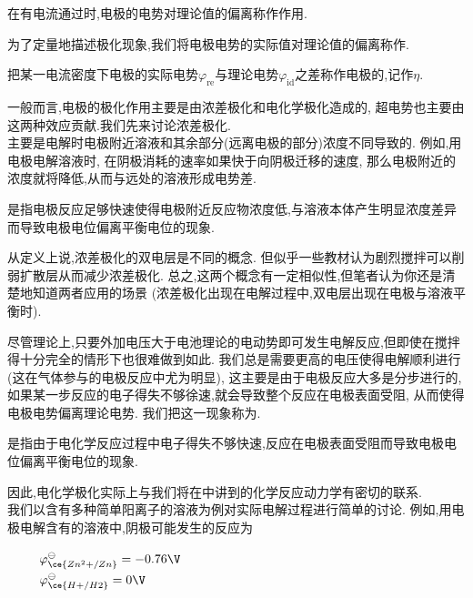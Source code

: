 \documentclass{ctexart}
\begin{document}
\begin{definition}[6E.1.3 极化]
    在有电流通过时,电极的电势对理论值的偏离称作作用.
\end{definition}
为了定量地描述极化现象,我们将电极电势的实际值对理论值的偏离称作.
\begin{definition}[6E.1.4 超电势]
    把某一电流密度下电极的实际电势$\varphi_{\text{re}}$与理论电势$\varphi_{\text{id}}$之差称作电极的,记作$\eta$.
\end{definition}
一般而言,电极的极化作用主要是由浓差极化和电化学极化造成的,%
超电势也主要由这两种效应贡献.我们先来讨论浓差极化.\\
\indent {}主要是电解时电极附近溶液和其余部分(远离电极的部分)浓度不同导致的.%
例如,用电极电解溶液时,%
在阴极消耗的速率如果快于向阴极迁移的速度,%
那么电极附近的浓度就将降低,从而与远处的溶液形成电势差.
\begin{definition}[6E.1.5 浓差极化]
    是指电极反应足够快速使得电极附近反应物浓度低,与溶液本体产生明显浓度差异而导致电极电位偏离平衡电位的现象.
\end{definition}
\begin{hint}
    从定义上说,浓差极化的双电层是不同的概念.%
    但似乎一些教材认为剧烈搅拌可以削弱扩散层从而减少浓差极化.%
    总之,这两个概念有一定相似性,但笔者认为你还是清楚地知道两者应用的场景%
    (浓差极化出现在电解过程中,双电层出现在电极与溶液平衡时).
\end{hint}
尽管理论上,只要外加电压大于电池理论的电动势即可发生电解反应,但即使在搅拌得十分完全的情形下也很难做到如此.%
我们总是需要更高的电压使得电解顺利进行(这在气体参与的电极反应中尤为明显),%
这主要是由于电极反应大多是分步进行的,如果某一步反应的电子得失不够徐速,就会导致整个反应在电极表面受阻,%
从而使得电极电势偏离理论电势.%
我们把这一现象称为.
\begin{definition}[6E.1.6 电化学极化]
    是指由于电化学反应过程中电子得失不够快速,反应在电极表面受阻而导致电极电位偏离平衡电位的现象.
\end{definition}
因此,电化学极化实际上与我们将在中讲到的化学反应动力学有密切的联系.\vspace{4pt}\\
\indent 我们以含有多种简单阳离子的溶液为例对实际电解过程进行简单的讨论.%
例如,用电极电解含有的溶液中,阴极可能发生的反应为
\begin{tightcenter}
    \ \ \ \ \ $\varphi_{\ce{Zn^2+/Zn}}^\ominus=-0.76\V$\\
    \ \ \ \ \ $\varphi_{\ce{H+/H2}}^\ominus=0\V$
\end{tightcenter}
\end{document}
